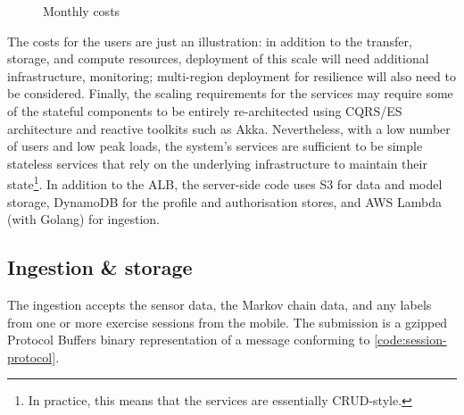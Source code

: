 \begin{figure}[h]
  \caption{Monthly costs}
  \label{plot:monthly-costs}
\end{figure}

The costs for the  users are just an illustration: in addition to the transfer, storage, and compute resources, deployment of this scale will need additional infrastructure, monitoring; multi-region deployment for resilience will also need to be considered. Finally, the scaling requirements for the services may require some of the stateful components to be entirely re-architected using CQRS/ES architecture and reactive toolkits such as Akka\cite{akka}. Nevertheless, with a low number of users and low peak loads, the system's services are sufficient to be simple stateless services that rely on the underlying infrastructure to maintain their state\footnote{In practice, this means that the services are essentially CRUD-style.}. In addition to the ALB, the server-side code uses S3 for data and model storage, DynamoDB for the profile and authorisation stores, and AWS Lambda (with Golang) for ingestion. 

\subsection{Ingestion \& storage}
The ingestion accepts the sensor data, the Markov chain data, and any labels from one or more exercise sessions from the mobile. The submission is a gzipped Protocol Buffers\cite{protobuf} binary representation of a message conforming to \autoref{code:session-protocol}.

